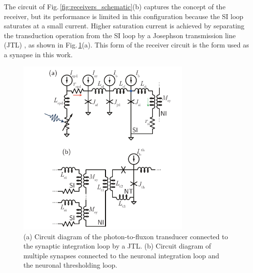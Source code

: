 \documentclass[twocolumn]{article}
\begin{document}
The circuit of Fig.\,\ref{fig:receivers_schematic}(b) captures the concept of the receiver, but its performance is limited in this configuration because the SI loop saturates at a small current. Higher saturation current is achieved by separating the transduction operation from the SI loop by a Josephson transmission line (JTL) \cite{ka1999,vatu1998}, as shown in Fig.\,\ref{fig:receivers_circuitDiagrams}(a). This form of the receiver circuit is the form used as a synapse in this work. 
\begin{figure}[t!]
	\centerline{\includegraphics[width=8.6cm]{_receivers_circuitDiagrams_small.pdf}}
	\caption{\label{fig:receivers_circuitDiagrams}(a) Circuit diagram of the photon-to-fluxon transducer connected to the synaptic integration loop by a JTL. (b) Circuit diagram of multiple synapses connected to the neuronal integration loop and the neuronal thresholding loop.}
\end{figure}
\end{document}
